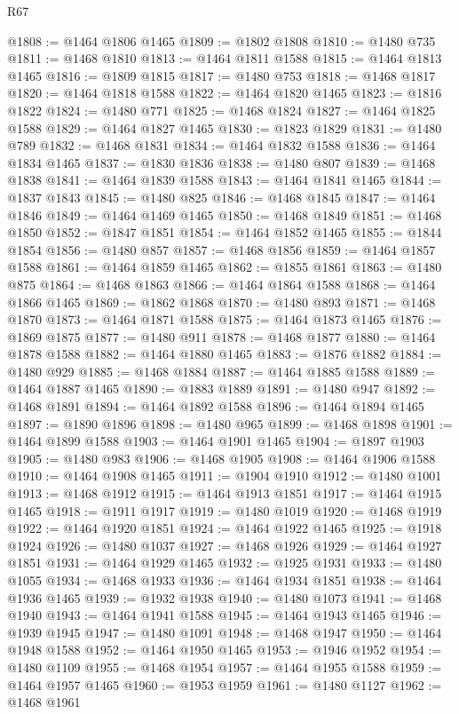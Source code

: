\begin{lexlean}{R67}
\begin{coremodule}
@1808 := @1464 @1806 @1465
@1809 := @1802 @1808
@1810 := @1480 @735
@1811 := @1468 @1810
@1813 := @1464 @1811 @1588
@1815 := @1464 @1813 @1465
@1816 := @1809 @1815
@1817 := @1480 @753
@1818 := @1468 @1817
@1820 := @1464 @1818 @1588
@1822 := @1464 @1820 @1465
@1823 := @1816 @1822
@1824 := @1480 @771
@1825 := @1468 @1824
@1827 := @1464 @1825 @1588
@1829 := @1464 @1827 @1465
@1830 := @1823 @1829
@1831 := @1480 @789
@1832 := @1468 @1831
@1834 := @1464 @1832 @1588
@1836 := @1464 @1834 @1465
@1837 := @1830 @1836
@1838 := @1480 @807
@1839 := @1468 @1838
@1841 := @1464 @1839 @1588
@1843 := @1464 @1841 @1465
@1844 := @1837 @1843
@1845 := @1480 @825
@1846 := @1468 @1845
@1847 := @1464 @1846
@1849 := @1464 @1469 @1465
@1850 := @1468 @1849
@1851 := @1468 @1850
@1852 := @1847 @1851
@1854 := @1464 @1852 @1465
@1855 := @1844 @1854
@1856 := @1480 @857
@1857 := @1468 @1856
@1859 := @1464 @1857 @1588
@1861 := @1464 @1859 @1465
@1862 := @1855 @1861
@1863 := @1480 @875
@1864 := @1468 @1863
@1866 := @1464 @1864 @1588
@1868 := @1464 @1866 @1465
@1869 := @1862 @1868
@1870 := @1480 @893
@1871 := @1468 @1870
@1873 := @1464 @1871 @1588
@1875 := @1464 @1873 @1465
@1876 := @1869 @1875
@1877 := @1480 @911
@1878 := @1468 @1877
@1880 := @1464 @1878 @1588
@1882 := @1464 @1880 @1465
@1883 := @1876 @1882
@1884 := @1480 @929
@1885 := @1468 @1884
@1887 := @1464 @1885 @1588
@1889 := @1464 @1887 @1465
@1890 := @1883 @1889
@1891 := @1480 @947
@1892 := @1468 @1891
@1894 := @1464 @1892 @1588
@1896 := @1464 @1894 @1465
@1897 := @1890 @1896
@1898 := @1480 @965
@1899 := @1468 @1898
@1901 := @1464 @1899 @1588
@1903 := @1464 @1901 @1465
@1904 := @1897 @1903
@1905 := @1480 @983
@1906 := @1468 @1905
@1908 := @1464 @1906 @1588
@1910 := @1464 @1908 @1465
@1911 := @1904 @1910
@1912 := @1480 @1001
@1913 := @1468 @1912
@1915 := @1464 @1913 @1851
@1917 := @1464 @1915 @1465
@1918 := @1911 @1917
@1919 := @1480 @1019
@1920 := @1468 @1919
@1922 := @1464 @1920 @1851
@1924 := @1464 @1922 @1465
@1925 := @1918 @1924
@1926 := @1480 @1037
@1927 := @1468 @1926
@1929 := @1464 @1927 @1851
@1931 := @1464 @1929 @1465
@1932 := @1925 @1931
@1933 := @1480 @1055
@1934 := @1468 @1933
@1936 := @1464 @1934 @1851
@1938 := @1464 @1936 @1465
@1939 := @1932 @1938
@1940 := @1480 @1073
@1941 := @1468 @1940
@1943 := @1464 @1941 @1588
@1945 := @1464 @1943 @1465
@1946 := @1939 @1945
@1947 := @1480 @1091
@1948 := @1468 @1947
@1950 := @1464 @1948 @1588
@1952 := @1464 @1950 @1465
@1953 := @1946 @1952
@1954 := @1480 @1109
@1955 := @1468 @1954
@1957 := @1464 @1955 @1588
@1959 := @1464 @1957 @1465
@1960 := @1953 @1959
@1961 := @1480 @1127
@1962 := @1468 @1961

\end{coremodule}
\end{lexlean}
